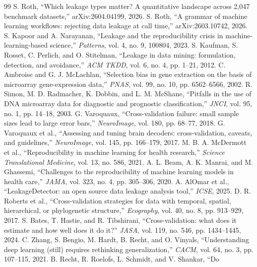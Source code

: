 \documentclass[10pt,twocolumn]{article}
\begin{document}
{\small
\begin{thebibliography}{99}
\itemsep0pt
 S. Roth, ``Which leakage types matter? A quantitative
landscape across 2,047 benchmark datasets,'' arXiv:2604.04199, 2026.
 S. Roth, ``A grammar of machine learning workflows:
rejecting data leakage at call time,'' arXiv:2603.10742, 2026.
 S. Kapoor and A. Narayanan, ``Leakage and the
reproducibility crisis in machine-learning-based science,'' \emph{Patterns},
vol. 4, no. 9, 100804, 2023.
 S. Kaufman, S. Rosset, C. Perlich, and O. Stitelman,
``Leakage in data mining: formulation, detection, and avoidance,'' \emph{ACM
TKDD}, vol. 6, no. 4, pp. 1--21, 2012.
 C. Ambroise and G. J. McLachlan, ``Selection bias in gene
extraction on the basis of microarray gene-expression data,'' \emph{PNAS},
vol. 99, no. 10, pp. 6562--6566, 2002.
 R. Simon, M. D. Radmacher, K. Dobbin, and L. M. McShane,
``Pitfalls in the use of DNA microarray data for diagnostic and prognostic
classification,'' \emph{JNCI}, vol. 95, no. 1, pp. 14--18, 2003.
 G. Varoquaux, ``Cross-validation failure: small sample
sizes lead to large error bars,'' \emph{NeuroImage}, vol. 180, pp. 68--77, 2018.
 G. Varoquaux et al., ``Assessing and tuning brain
decoders: cross-validation, caveats, and guidelines,'' \emph{NeuroImage},
vol. 145, pp. 166--179, 2017.
 M. B. A. McDermott et al., ``Reproducibility in machine
learning for health research,'' \emph{Science Translational Medicine}, vol. 13,
no. 586, 2021.
 A. L. Beam, A. K. Manrai, and M. Ghassemi, ``Challenges to
the reproducibility of machine learning models in health care,'' \emph{JAMA},
vol. 323, no. 4, pp. 305--306, 2020.
 A. AlOmar et al., ``LeakageDetector: an open source data
leakage analysis tool,'' \emph{ICSE}, 2025.
 D. R. Roberts et al., ``Cross-validation strategies for
data with temporal, spatial, hierarchical, or phylogenetic structure,''
\emph{Ecography}, vol. 40, no. 8, pp. 913--929, 2017.
 S. Bates, T. Hastie, and R. Tibshirani, ``Cross-validation:
what does it estimate and how well does it do it?'' \emph{JASA}, vol. 119,
no. 546, pp. 1434--1445, 2024.
 C. Zhang, S. Bengio, M. Hardt, B. Recht, and O. Vinyals,
``Understanding deep learning (still) requires rethinking generalization,''
\emph{CACM}, vol. 64, no. 3, pp. 107--115, 2021.
 B. Recht, R. Roelofs, L. Schmidt, and V. Shankar, ``Do

\end{thebibliography}}
\end{document}
